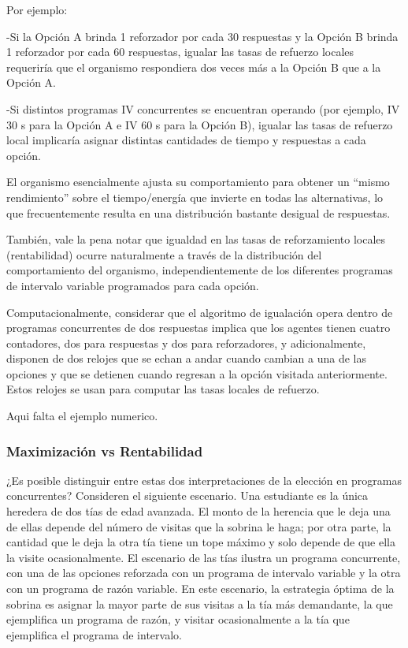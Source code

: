 \documentclass[
  letterpaper,
]{book}
\begin{document}
Por ejemplo:

-Si la Opción A brinda 1 reforzador por cada 30 respuestas y la Opción B
brinda 1 reforzador por cada 60 respuestas, igualar las tasas de
refuerzo locales requeriría que el organismo respondiera dos veces más a
la Opción B que a la Opción A.

-Si distintos programas IV concurrentes se encuentran operando (por
ejemplo, IV 30 s para la Opción A e IV 60 s para la Opción B), igualar
las tasas de refuerzo local implicaría asignar distintas cantidades de
tiempo y respuestas a cada opción.

El organismo esencialmente ajusta su comportamiento para obtener un
``mismo rendimiento'' sobre el tiempo/energía que invierte en todas las
alternativas, lo que frecuentemente resulta en una distribución bastante
desigual de respuestas.

También, vale la pena notar que igualdad en las tasas de reforzamiento
locales (rentabilidad) ocurre naturalmente a través de la distribución
del comportamiento del organismo, independientemente de los diferentes
programas de intervalo variable programados para cada opción.

Computacionalmente, considerar que el algoritmo de igualación opera
dentro de programas concurrentes de dos respuestas implica que los
agentes tienen cuatro contadores, dos para respuestas y dos para
reforzadores, y adicionalmente, disponen de dos relojes que se echan a
andar cuando cambian a una de las opciones y que se detienen cuando
regresan a la opción visitada anteriormente. Estos relojes se usan para
computar las tasas locales de refuerzo.

Aqui falta el ejemplo numerico.

\subsubsection{Maximización vs
Rentabilidad}\label{maximizaciuxf3n-vs-rentabilidad}

¿Es posible distinguir entre estas dos interpretaciones de la elección
en programas concurrentes? Consideren el siguiente escenario. Una
estudiante es la única heredera de dos tías de edad avanzada. El monto
de la herencia que le deja una de ellas depende del número de visitas
que la sobrina le haga; por otra parte, la cantidad que le deja la otra
tía tiene un tope máximo y solo depende de que ella la visite
ocasionalmente. El escenario de las tías ilustra un programa
concurrente, con una de las opciones reforzada con un programa de
intervalo variable y la otra con un programa de razón variable. En este
escenario, la estrategia óptima de la sobrina es asignar la mayor parte
de sus visitas a la tía más demandante, la que ejemplifica un programa
de razón, y visitar ocasionalmente a la tía que ejemplifica el programa
de intervalo.
\end{document}
